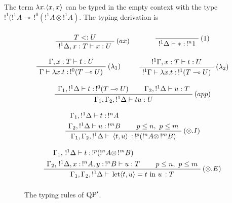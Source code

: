 \begin{exmp} The term $\lambda x.\langle x, x \rangle$ can be typed in the empty context with the type 
	$!^1(!^1 A \multimap \,!^0(!^1A \otimes !^1A)$. The typing derivation is
		\begin{prooftree}
		\end{prooftree}
\end{exmp}

\begin{figure}[!ht]
\begin{mdframed}
	$$ $$
	$$ \mbox{
		\AxiomC{$T <: U$}
		\RightLabel{$(ax)$}
		\UnaryInfC{$!^1 \Delta, x : T \vdash x : U$}
		\DisplayProof
		~~
		~~
		~~
		\AxiomC{}
		\RightLabel{$(1)$}
		\UnaryInfC{$!^1 \Delta \vdash * : \,!^n 1$}
		\DisplayProof
	} $$
	$$ $$
	$$ \mbox{
		\AxiomC{$\Gamma, x : T \vdash t : U$}
		\RightLabel{$(\lambda_1)$}
		\UnaryInfC{$\Gamma \vdash \lambda x.t : \,!^0 (T \multimap U)$}
		\DisplayProof
		~~
		~~
		\AxiomC{$!^1 \Gamma, x : T \vdash t : U$}
		\RightLabel{$(\lambda_2)$}
		\UnaryInfC{$!^1 \Gamma \vdash \lambda x.t : \,!^1 (T \multimap U)$}
		\DisplayProof
	} $$
	$$ $$
	$$ \mbox{
		\AxiomC{$\Gamma_1, !^1\Delta \vdash t : \,!^0(T \multimap U)$}
		\AxiomC{$\Gamma_2, !^1\Delta \vdash u : T$}
		\RightLabel{$(app)$}
		\BinaryInfC{$\Gamma_1, \Gamma_2, !^1\Delta \vdash t u : U$}
		\DisplayProof
	} $$
	$$ $$
	$$ \mbox{
		\AxiomC{$\Gamma_1, !^1\Delta \vdash t : \, !^nA$}
		\noLine
		\UnaryInfC{$\Gamma_2, !^1\Delta \vdash u : \, !^mB$}
		\AxiomC{$p \le n, ~ p \le m$}
		\RightLabel{$(\otimes.I)$}
		\BinaryInfC{$\Gamma_1, \Gamma_2, !^1\Delta \vdash \, \pair{t}{u} \, : \,!^p(!^nA \otimes \,!^mB)$}
		\DisplayProof
	} $$
	$$ $$
	$$ \mbox{
		\AxiomC{$\Gamma_1, \,!^1\Delta \vdash t : \, !^p (!^nA \otimes \,!^mB)$}
		\noLine
		\UnaryInfC{$\Gamma_2, \,!^1\Delta, x : \,!^nA, y : \,!^nB \vdash u : T$}
		\AxiomC{$p \le n, ~ p \le m$}
		\RightLabel{$(\otimes.E)$}
		\BinaryInfC{$\Gamma_1, \Gamma_2, !^1\Delta \vdash \, \text{let} \pair{t}{u} = t ~ \text{in} ~ u \, : T$}
		\DisplayProof
	} $$
	$$ $$
\end{mdframed}
\caption{The typing rules of ${\rm QP}'$.}
\label{typingQP'}
\end{figure}

